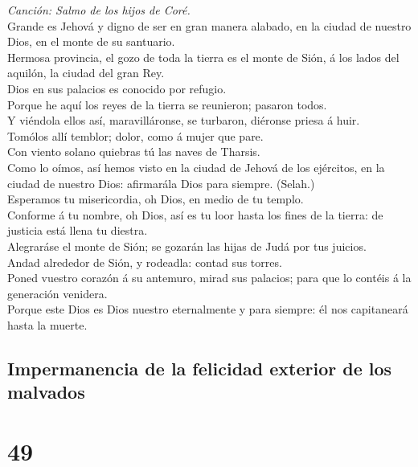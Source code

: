  \emph{Canción: Salmo de los hijos de Coré.}\\
Grande es Jehová y digno de ser en gran manera alabado, en la ciudad de
nuestro Dios, en el monte de su santuario.\\
 Hermosa provincia, el gozo de toda la tierra es el monte de
Sión, á los lados del aquilón, la ciudad del gran Rey.\\
 Dios en sus palacios es conocido por refugio.\\
 Porque he aquí los reyes de la tierra se reunieron; pasaron
todos.\\
 Y viéndola ellos así, maravilláronse, se turbaron, diéronse
priesa á huir.\\
 Tomólos allí temblor; dolor, como á mujer que pare.\\
 Con viento solano quiebras tú las naves de Tharsis.\\
 Como lo oímos, así hemos visto en la ciudad de Jehová de
los ejércitos, en la ciudad de nuestro Dios: afirmarála Dios para
siempre. (Selah.)\\
 Esperamos tu misericordia, oh Dios, en medio de tu
templo.\\
 Conforme á tu nombre, oh Dios, así es tu loor hasta los
fines de la tierra: de justicia está llena tu diestra.\\
 Alegraráse el monte de Sión; se gozarán las hijas de Judá
por tus juicios.\\
 Andad alrededor de Sión, y rodeadla: contad sus torres.\\
 Poned vuestro corazón á su antemuro, mirad sus palacios;
para que lo contéis á la generación venidera.\\
 Porque este Dios es Dios nuestro eternalmente y para
siempre: él nos capitaneará hasta la muerte.

\hypertarget{impermanencia-de-la-felicidad-exterior-de-los-malvados}{%
\subsection{Impermanencia de la felicidad exterior de los
malvados}\label{impermanencia-de-la-felicidad-exterior-de-los-malvados}}

\hypertarget{section-48}{%
\section{49}\label{section-48}}

